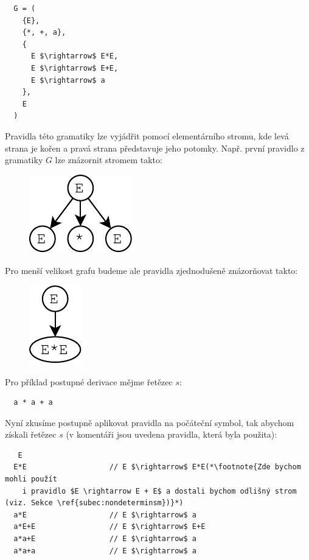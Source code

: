 \begin{lstlisting}
  G = (
    {E},
    {*, +, a},
    {
      E $\rightarrow$ E*E,
      E $\rightarrow$ E+E,
      E $\rightarrow$ a
    },
    E
  )
\end{lstlisting}
\noindent
Pravidla této gramatiky lze vyjádřit pomocí elementárního stromu,
kde levá strana je kořen a pravá strana představuje jeho potomky.
Např. první pravidlo z gramatiky $G$ lze znázornit stromem takto:
\begin{figure}[H]
  \centering
  \includegraphics{fig/RuleTree1.pdf}
\end{figure}

\noindent
Pro menší velikost grafu budeme ale pravidla zjednodušeně znázorňovat takto:

\begin{figure}[H]
  \centering
  \includegraphics{fig/RuleTree2.pdf}
\end{figure}

\noindent
Pro příklad postupné derivace mějme řetězec $s$:

\begin{lstlisting}
  a * a + a
\end{lstlisting}

\noindent
Nyní zkusíme postupně aplikovat pravidla na počáteční symbol,
tak abychom získali řetězec $s$
(v komentáři jsou uvedena pravidla, která byla použita):

\begin{lstlisting}
   E
  E*E                   // E $\rightarrow$ E*E(*\footnote{Zde bychom mohli použít
    i pravidlo $E \rightarrow E + E$ a dostali bychom odlišný strom (viz. Sekce \ref{subec:nondeterminsm})}*)
  a*E                   // E $\rightarrow$ a
  a*E+E                 // E $\rightarrow$ E+E
  a*a+E                 // E $\rightarrow$ a
  a*a+a                 // E $\rightarrow$ a
\end{lstlisting}

